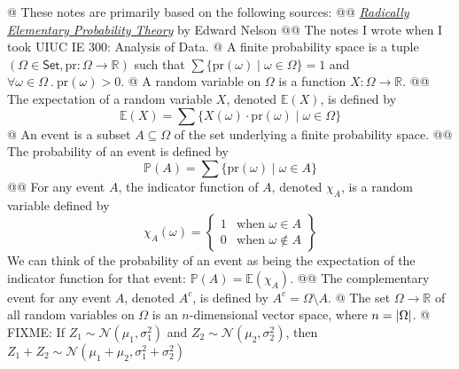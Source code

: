 \documentclass[]{article}
\DeclarePairedDelimiter{\abs}{\lvert}{\rvert}
\newcommand{\textbs}[1]{{\sffamily\fontseries{sbc}\selectfont #1}}
\newcommand{\mbb}[1]{\ensuremath{\mathbb{#1}}}     %
\newcommand{\mrm}[1]{\ensuremath{\mathrm{#1}}}     %
\newcommand{\mcl}[1]{\ensuremath{\mathcal{#1}}}    %
\newcommand{\catset}[0]{\ensuremath{\mathsf{Set}}}
\renewcommand{\complement}[1]{{{#1}^{c}}}
\newcommand{\define}[1]{\textbs{#1}}
\begin{document}
\begin{easylist}[itemize]
@ These notes are primarily based on the following sources:
@@ {%
  \href{https://web.math.princeton.edu/~nelson/books/rept.pdf}{%
    \textit{Radically Elementary Probability Theory}}
  by Edward Nelson
}
@@ {%
  The notes I wrote when I took UIUC IE 300: Analysis of Data.
}
@ {%
  A \define{finite probability space} is a tuple
  $(\Omega \in \catset, \mathrm{pr} : \Omega \to \mbb{R})$ such
  that $\sum \{\mrm{pr}(\omega) \mid \omega \in \Omega\} = 1$
  and $\forall \omega \in \Omega ~.~ \mathrm{pr}(\omega) > 0$.
}
@ {%
  A \define{random variable} on $\Omega$ is a function $X : \Omega \to \mbb{R}$.
}
@@ {%
  The \define{expectation} of a random variable $X$, denoted $\mbb{E}(X)$, is
  defined by
  \begin{equation*}
  \mbb{E}(X)
  = \sum \{ X(\omega) \cdot \mrm{pr}(\omega) \mid \omega \in \Omega \}
  \end{equation*}
  \vspace{-2em}
}
@ {%
  An \define{event} is a subset $A \subseteq \Omega$ of the set underlying a
  finite probability space.
}
@@ {%
  The \define{probability} of an event is defined by
  \begin{equation*}
  \mbb{P}(A)
  = \sum \{ \mrm{pr}(\omega) \mid \omega \in A \}
  \end{equation*}
  \vspace{-2em}
}
@@ {%
  For any event $A$, the \define{indicator function} of $A$, denoted $\chi_A$,
  is a random variable defined by
  \begin{equation*}
  \chi_A(\omega)
  = \left\{
  \begin{array}{lr}
    1 & \text{when } \omega \in    A \\
    0 & \text{when } \omega \notin A
  \end{array}
  \right\}
  \end{equation*}
  We can think of the probability of an event as being the expectation of the
  indicator function for that event: $\mbb{P}(A) = \mbb{E}(\chi_A)$.
}
@@ {%
  The \define{complementary event} for any event $A$, denoted $\complement{A}$,
  is defined by $\complement{A} = \Omega \setminus A$.
}
@ {%
  The set $\Omega \to \mbb{R}$ of all random variables on $\Omega$ is an
  $n$-dimensional vector space, where $n = \abs{\Omega}$.
}
@ {%
  FIXME: If $Z_1 \sim \mcl{N}(\mu_1, \sigma_1^2)$
  and $Z_2 \sim \mcl{N}(\mu_2, \sigma_2^2)$,
  then $Z_1 + Z_2 \sim \mcl{N}(\mu_1 + \mu_2, \sigma_1^2 + \sigma_2^2)$
}
\end{easylist}
\end{document}
